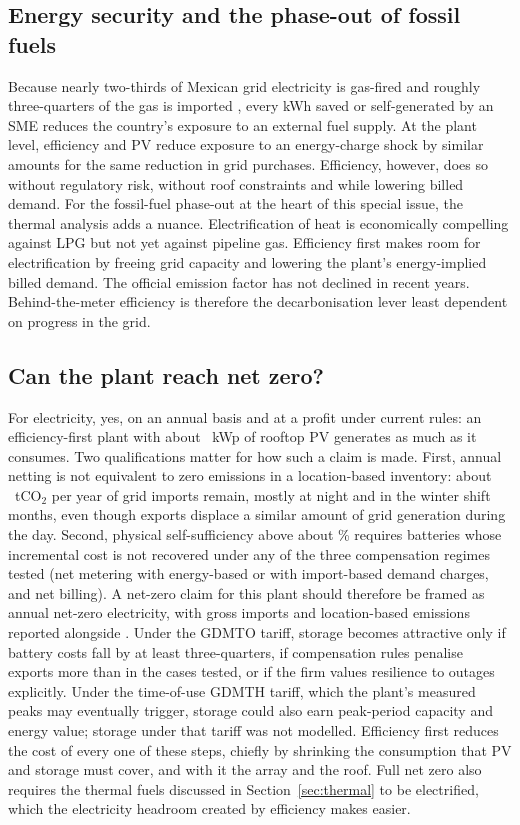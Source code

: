 \documentclass[preprint,12pt,authoryear]{elsarticle}
\begin{document}
\subsection{Energy security and the phase-out of fossil fuels}
Because nearly two-thirds of Mexican grid electricity is gas-fired and roughly three-quarters of the gas is imported \citep{sener2025plan,eia2025mexico}, every kWh saved or self-generated by an SME reduces the country's exposure to an external fuel supply. At the plant level, efficiency and PV reduce exposure to an energy-charge shock by similar amounts for the same reduction in grid purchases. Efficiency, however, does so without regulatory risk, without roof constraints and while lowering billed demand. For the fossil-fuel phase-out at the heart of this special issue, the thermal analysis adds a nuance. Electrification of heat is economically compelling against LPG but not yet against pipeline gas. Efficiency first makes room for electrification by freeing grid capacity and lowering the plant's energy-implied billed demand. The official emission factor has not declined in recent years. Behind-the-meter efficiency is therefore the decarbonisation lever least dependent on progress in the grid.

\subsection{Can the plant reach net zero?}
For electricity, yes, on an annual basis and at a profit under current rules: an efficiency-first plant with about \nKWpNZE~kWp of rooftop PV generates as much as it consumes. Two qualifications matter for how such a claim is made. First, annual netting is not equivalent to zero emissions in a location-based inventory: about \nCOGrossNZE~tCO$_2$ per year of grid imports remain, mostly at night and in the winter shift months, even though exports displace a similar amount of grid generation during the day. Second, physical self-sufficiency above about \nFirstBattery\% requires batteries whose incremental cost is not recovered under any of the three compensation regimes tested (net metering with energy-based or with import-based demand charges, and net billing). A net-zero claim for this plant should therefore be framed as annual net-zero electricity, with gross imports and location-based emissions reported alongside \citep{iso50001}. Under the GDMTO tariff, storage becomes attractive only if battery costs fall by at least three-quarters, if compensation rules penalise exports more than in the cases tested, or if the firm values resilience to outages explicitly. Under the time-of-use GDMTH tariff, which the plant's measured peaks may eventually trigger, storage could also earn peak-period capacity and energy value; storage under that tariff was not modelled. Efficiency first reduces the cost of every one of these steps, chiefly by shrinking the consumption that PV and storage must cover, and with it the array and the roof. Full net zero also requires the thermal fuels discussed in Section~\ref{sec:thermal} to be electrified, which the electricity headroom created by efficiency makes easier.
\end{document}
